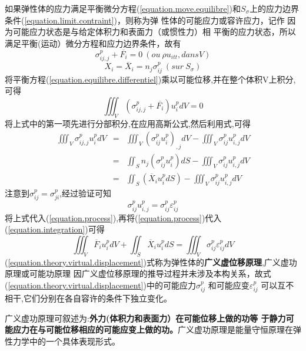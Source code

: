 \documentclass{book}
\begin{document}
如果弹性体的应力满足平衡微分方程(\ref{equation.move.equilibre})和$S_{\sigma}$上的应力边界条件(\ref{equation.limit.contraint})，则称为弹
性体的可能应力或容许应力，记作 因为可能应力状态是与给定体积力和表面力（或惯性力）相
平衡的应力状态，所以满足平衡(运动）微分方程和应力边界条件，故有
\begin{equation}
 \sigma_{ij,j}^p + \overline{F_i}=0 ~ (ou ~\rho u_{itt},dans V)
 \label{equation.equilibre.differentiel}
\end{equation}
\begin{equation}
 X_i=\overline{X}_i=n_j \sigma_{ij}^p  ~ (sur ~S_{\sigma})
\end{equation}
将平衡方程(\ref{equation.equilibre.differentiel})乘以可能位移,并在整个体积V上积分,可得
\begin{equation}
 \iiint_V(\sigma_{ij,j}^p + \overline{F_i})u_i^p dV=0
 \label{equation.integration}
\end{equation}
将上式中的第一项先进行分部积分,在应用高斯公式,然后利用式,可得
\begin{eqnarray}
    \iiint_V\sigma_{ij,j}^p u_i^p dV & = & \iiint_V(\sigma_{ij}^p u_{i}^p)_{,j}dV - \iiint_V \sigma_{ij}^p u_{i,j}^p dV \\
                                    &  =  & \iint_S n_j(\sigma_{ij}^p u_{i}^p)dS - \iiint_V \sigma_{ij}^p u_{i,j}^p dV \\
                                    &  =  &\iint_S (\overline{X}_i u_i^pdS) - \iiint_V \sigma_{ij}^p u_{i,j}^p dV
\label{equation.process}
\end{eqnarray}
注意到$\sigma_{ij}^p=\sigma_{ji}^p$,经过验证可知
\begin{equation}
\sigma_{ij}^p u_{i,j}^p = \sigma_{ij}^p \varepsilon_{ij}^p
\end{equation}
将上式代入(\ref{equation.process}),再将(\ref{equation.process})代入(\ref{equation.integration})可得
\begin{equation}
 \iiint_V \overline{F}_i u_i^p dV + \iint_S \overline{X}_i u_i^p dS = \iiint_V \sigma_{ij}^p \varepsilon_{ij}^p dV
 \label{equation.theory.virtual.displacement}
\end{equation}
(\ref{equation.theory.virtual.displacement})式称为弹性体的\textbf{广义虚位移原理},广义虚功原理或可能功原理
因广义虚位移原理的推导过程并未涉及本构关系，故式(\ref{equation.theory.virtual.displacement})中的可能应力$\sigma_{ij}^p$
和可能应变$\varepsilon_{ij}^p$ 可以互不相干,它们分别在各自容许的条件下独立变化。

广义虚功原理可叙述为:\textbf{外力(体积力和表面力）在可能位移上做的功等
于静力可能应力在与可能位移相应的可能应变上做的功。}广义虚功原理是能量守恒原理在弹性力学中的一个具体表现形式。
\end{document}
